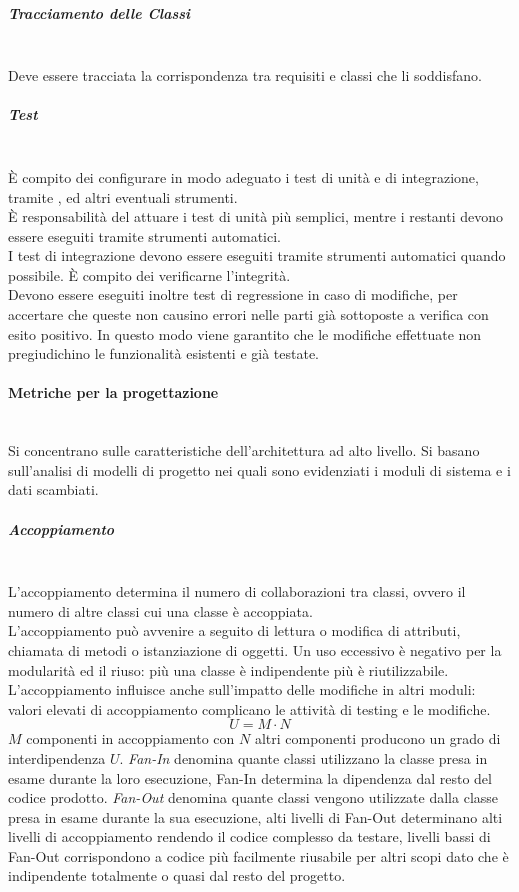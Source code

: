 \subparagraph{Tracciamento delle Classi}\mbox{}\\
Deve essere tracciata la corrispondenza tra requisiti e classi che li soddisfano.

\subparagraph{Test}\mbox{}\\
\`{E} compito dei \Progettisti{} configurare in modo adeguato i test di unità e di integrazione, tramite ,  ed altri eventuali strumenti.\\
\`{E} responsabilità del \Programmatore{} attuare i test di unità più semplici, mentre i restanti devono essere eseguiti tramite strumenti automatici.\\
I test di integrazione devono essere eseguiti tramite strumenti automatici quando possibile. \`{E} compito dei \Verificatori{} verificarne l'integrità.\\
Devono essere eseguiti inoltre test di regressione in caso di modifiche, per accertare che queste non causino errori nelle parti già sottoposte a verifica con esito positivo. In questo modo viene garantito che le modifiche effettuate non pregiudichino le funzionalità esistenti e già testate.

\paragraph{Metriche per la progettazione}\mbox{}\\
Si concentrano sulle caratteristiche dell'architettura ad alto livello. Si basano sull'analisi di modelli di progetto nei quali sono evidenziati i moduli di sistema e i dati scambiati.

\subparagraph{Accoppiamento}\mbox{}\\
L'accoppiamento determina il numero di collaborazioni tra classi, ovvero il numero di altre classi cui una classe è accoppiata.\\
L'accoppiamento può avvenire a seguito di lettura o modifica di attributi, chiamata di metodi o istanziazione di oggetti. Un uso eccessivo è negativo per la modularità ed il riuso: più una classe è indipendente più è riutilizzabile. L'accoppiamento influisce anche sull'impatto delle modifiche in altri moduli: valori elevati di accoppiamento complicano le attività di testing e le modifiche.
\[ U = M \cdot N \]
$M$ componenti in accoppiamento con $N$ altri componenti producono un grado di interdipendenza $U$.
\textit{Fan-In} denomina quante classi utilizzano la classe presa in esame durante la loro esecuzione, Fan-In determina la dipendenza dal resto del codice prodotto. 
\textit{Fan-Out} denomina quante classi vengono utilizzate dalla classe presa in esame durante la sua esecuzione, alti livelli di Fan-Out determinano alti livelli di accoppiamento rendendo il codice complesso da testare, livelli bassi di Fan-Out corrispondono a codice più facilmente riusabile per altri scopi dato che è indipendente totalmente o quasi dal resto del progetto.

